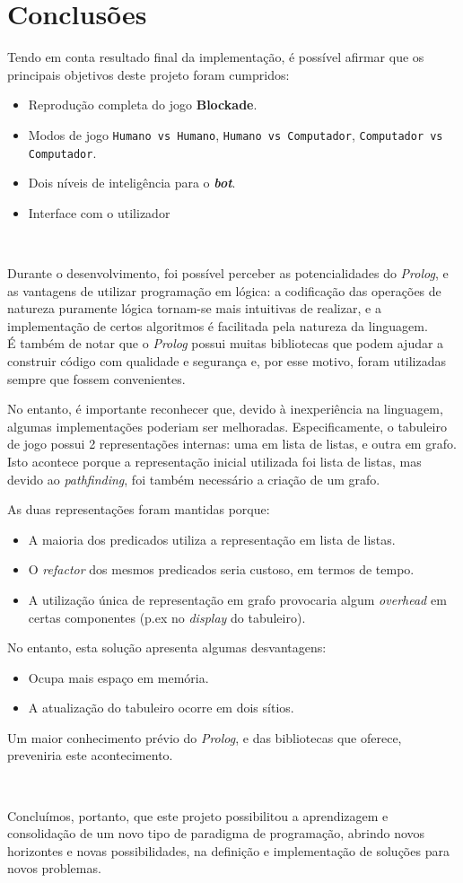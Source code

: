 \documentclass[a4paper]{article}
\begin{document}
\section{Conclusões}
Tendo em conta resultado final da implementação, é possível afirmar que os principais objetivos deste projeto foram cumpridos:
\begin{itemize}
	\item Reprodução completa do jogo \textbf{Blockade}.
	\item Modos de jogo \texttt{Humano vs Humano}, \texttt{Humano vs Computador}, \texttt{Computador vs Computador}.
	\item Dois níveis de inteligência para o \textbf{\textit{bot}}.
	\item Interface com o utilizador
\end{itemize}
\ \par
Durante o desenvolvimento, foi possível perceber as potencialidades do \textit{Prolog}, e as vantagens de utilizar programação em lógica: a codificação das operações de natureza puramente lógica tornam-se mais intuitivas de realizar, e a implementação de certos algoritmos é facilitada pela natureza da linguagem. \\
É também de notar que o \textit{Prolog} possui muitas bibliotecas que podem ajudar a construir código com qualidade e segurança e, por esse motivo, foram utilizadas sempre que fossem convenientes. \par
No entanto, é importante reconhecer que, devido à inexperiência na linguagem, algumas implementações poderiam ser melhoradas. Especificamente, o tabuleiro de jogo possui 2 representações internas: uma em lista de listas, e outra em grafo. Isto acontece porque a representação inicial utilizada foi lista de listas, mas devido ao \textit{pathfinding}, foi também necessário a criação de um grafo. \par
As duas representações foram mantidas porque:
\begin{itemize}
	\item A maioria dos predicados utiliza a representação em lista de listas.
	\item O \textit{refactor} dos mesmos predicados seria custoso, em termos de tempo.
	\item A utilização única de representação em grafo provocaria algum \textit{overhead} em certas componentes (p.ex no \textit{display} do tabuleiro).
\end{itemize}
No entanto, esta solução apresenta algumas desvantagens:
\begin{itemize}
	\item Ocupa mais espaço em memória.
	\item A atualização do tabuleiro ocorre em dois sítios.
\end{itemize}
Um maior conhecimento prévio do \textit{Prolog}, e das bibliotecas que oferece, preveniria este acontecimento. \par
\ \par
Concluímos, portanto, que este projeto possibilitou a aprendizagem e consolidação de um novo tipo de paradigma de programação, abrindo novos horizontes e novas possibilidades, na definição e implementação de soluções para novos problemas.
\end{document}
